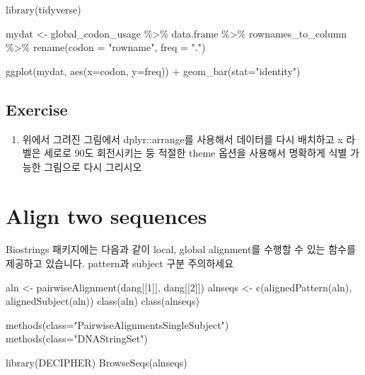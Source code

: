\documentclass[
]{book}
\newenvironment{Shaded}{\begin{snugshade}}{\end{snugshade}}
\newcommand{\AttributeTok}[1]{\textcolor[rgb]{0.77,0.63,0.00}{#1}}
\newcommand{\DecValTok}[1]{\textcolor[rgb]{0.00,0.00,0.81}{#1}}
\newcommand{\FunctionTok}[1]{\textcolor[rgb]{0.00,0.00,0.00}{#1}}
\newcommand{\NormalTok}[1]{#1}
\newcommand{\OtherTok}[1]{\textcolor[rgb]{0.56,0.35,0.01}{#1}}
\newcommand{\SpecialCharTok}[1]{\textcolor[rgb]{0.00,0.00,0.00}{#1}}
\newcommand{\StringTok}[1]{\textcolor[rgb]{0.31,0.60,0.02}{#1}}
\providecommand{\tightlist}{%
  \setlength{\itemsep}{0pt}\setlength{\parskip}{0pt}}
\begin{document}
\begin{Shaded}
\begin{Highlighting}[]
\FunctionTok{library}\NormalTok{(tidyverse)}

\NormalTok{mydat }\OtherTok{\textless{}{-}}\NormalTok{ global\_codon\_usage }\SpecialCharTok{\%\textgreater{}\%} 
\NormalTok{  data.frame }\SpecialCharTok{\%\textgreater{}\%} 
\NormalTok{  rownames\_to\_column }\SpecialCharTok{\%\textgreater{}\%} 
  \FunctionTok{rename}\NormalTok{(}\AttributeTok{codon =} \StringTok{"rowname"}\NormalTok{, }\AttributeTok{freq =} \StringTok{"."}\NormalTok{) }

\FunctionTok{ggplot}\NormalTok{(mydat, }\FunctionTok{aes}\NormalTok{(}\AttributeTok{x=}\NormalTok{codon, }\AttributeTok{y=}\NormalTok{freq)) }\SpecialCharTok{+}
  \FunctionTok{geom\_bar}\NormalTok{(}\AttributeTok{stat=}\StringTok{"identity"}\NormalTok{) }
\end{Highlighting}
\end{Shaded}

\hypertarget{exercise-8}{%
\subsection{Exercise}\label{exercise-8}}

\begin{enumerate}
\def\labelenumi{\arabic{enumi}.}
\tightlist
\item
  위에서 그려진 그림에서 dplyr::arrange를 사용해서 데이터를 다시 배치하고 x 라벨은 세로로 90도 회전시키는 둥 적절한 theme 옵션을 사용해서 명확하게 식별 가능한 그림으로 다시 그리시오
\end{enumerate}

\hypertarget{align-two-sequences}{%
\section{Align two sequences}\label{align-two-sequences}}

Biostrings 패키지에는 다음과 같이 local, global alignment를 수행할 수 있는 함수를 제공하고 있습니다. pattern과 subject 구분 주의하세요

\begin{Shaded}
\begin{Highlighting}[]
\NormalTok{aln }\OtherTok{\textless{}{-}} \FunctionTok{pairwiseAlignment}\NormalTok{(dang[[}\DecValTok{1}\NormalTok{]], dang[[}\DecValTok{2}\NormalTok{]])}
\NormalTok{alnseqs }\OtherTok{\textless{}{-}} \FunctionTok{c}\NormalTok{(}\FunctionTok{alignedPattern}\NormalTok{(aln), }\FunctionTok{alignedSubject}\NormalTok{(aln))}
\FunctionTok{class}\NormalTok{(aln)}
\FunctionTok{class}\NormalTok{(alnseqs)}

\FunctionTok{methods}\NormalTok{(}\AttributeTok{class=}\StringTok{"PairwiseAlignmentsSingleSubject"}\NormalTok{)}
\FunctionTok{methods}\NormalTok{(}\AttributeTok{class=}\StringTok{"DNAStringSet"}\NormalTok{)}

\FunctionTok{library}\NormalTok{(DECIPHER)}
\FunctionTok{BrowseSeqs}\NormalTok{(alnseqs)}
\end{Highlighting}
\end{Shaded}
\end{document}
